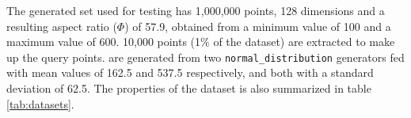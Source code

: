 The generated set used for testing has 1,000,000 points, 128 dimensions and a resulting aspect ratio ($\Phi$) of 57.9, obtained from a minimum value of 100 and a maximum value of 600. 10,000 points (1\% of the dataset) are extracted to make up the query points. \clust{} are generated from two \texttt{normal\_distribution} generators fed with mean values of 162.5 and 537.5 respectively, and both with a standard deviation of 62.5. The properties of the dataset is also summarized in table \ref{tab:datasets}.